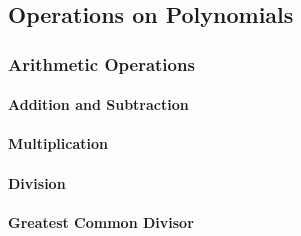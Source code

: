 


\subsection{Operations on Polynomials}

\subsubsection{Arithmetic Operations}

\paragraph{Addition and Subtraction}

\paragraph{Multiplication}

\paragraph{Division}

\paragraph{Greatest Common Divisor}

